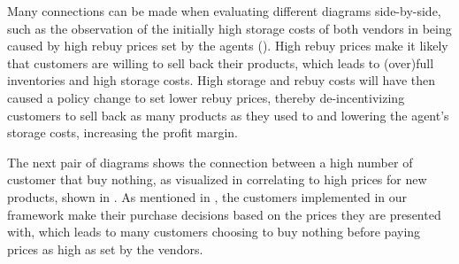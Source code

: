 Many connections can be made when evaluating different diagrams side-by-side, such as the observation of the initially high storage costs of both vendors in  being caused by high rebuy prices set by the agents (). High rebuy prices make it likely that customers are willing to sell back their products, which leads to (over)full inventories and high storage costs. High storage and rebuy costs will have then caused a policy change to set lower rebuy prices, thereby de-incentivizing customers to sell back as many products as they used to and lowering the agent's storage costs, increasing the profit margin.

The next pair of diagrams shows the connection between a high number of customer that buy nothing, as visualized in  correlating to high prices for new products, shown in . As mentioned in , the customers implemented in our framework make their purchase decisions based on the prices they are presented with, which leads to many customers choosing to buy nothing before paying prices as high as set by the vendors.

